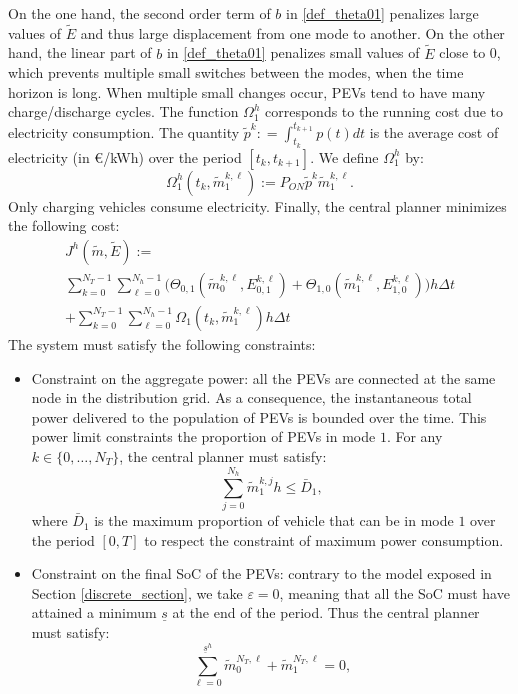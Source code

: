 \documentclass[conference]{IEEEtran}
\begin{document}
On the one hand, 
the second order term of $b$ in \eqref{def_theta01} penalizes large values of $\tilde{E}$  and thus large displacement from one mode to another. On the other hand, the linear part of $b$ in \eqref{def_theta01} penalizes small values of $\tilde{E}$ close to 0, which prevents multiple small switches between the modes, when the time horizon is long. When multiple small changes occur, PEVs tend to have many charge/discharge cycles. The function $\Omega^h_{1}$ corresponds to the running cost due to electricity consumption. The quantity $\textstyle \tilde{p}^k: = \int_{t_k}^{t_{k+1}}p(t)dt$ is the average cost of electricity (in \euro/kWh) over the period $[t_k,t_{k+1}]$. We define $\Omega^h_{1}$ by:
\begin{equation*}
\Omega^h_{1}(t_k,\tilde{m}_1^{k,\ell}):=P_{ON}\tilde{p}^k\tilde{m}^{k,\ell}_1.
\end{equation*}
Only charging vehicles consume electricity. 
Finally, the central planner minimizes the following cost:
\begin{equation}
\label{def_Jh_case_0}
\begin{array}{l}
 J^h(\tilde{m},\tilde{E}):=\\
\sum_{k=0}^{N_T-1}\sum_{\ell=0}^{N_h-1}
  \big(  \Theta_{0,1}(\tilde{m}^{k,\ell}_0,E_{0,1}^{k,\ell})
  +\Theta_{1,0}(\tilde{m}^{k,\ell}_1,E_{1,0}^{k,\ell})\big)
  h\Delta t\\
   +\sum_{k=0}^{N_T-1}\sum_{\ell=0}^{N_h-1} \Omega_{1}(t_k,\tilde{m}_1^{k,\ell}) h\Delta t
\end{array}
\end{equation}
The system must satisfy the following constraints:
\begin{itemize}
\item Constraint on the aggregate power: all the PEVs are connected at the same node in the distribution grid. As a consequence, the instantaneous total power delivered to the population of PEVs is bounded over the time. This power limit constraints the proportion of PEVs in mode $1$. For any $k\in\{0,\ldots,N_T \}$, the central planner must satisfy:
\begin{equation}
\label{contraintes:etat0}
\sum_{j=0}^{N_h}\tilde{m}_1^{k,j}h\leq \bar{D}_1,
\end{equation}
where $\bar{D}_1$ is the maximum proportion of vehicle that can be in mode $1$ over the period $[0,T]$ to respect the constraint of maximum power consumption.

\item Constraint on the final SoC of the PEVs: contrary to the model exposed in Section \ref{discrete_section}, we take $\varepsilon=0$, meaning that all the SoC must have attained a minimum $\underline{s}$ at the end of the period. Thus the central planner must satisfy:
\begin{equation}
\label{dis_smin0}
\sum_{\ell = 0}^{\underline{s}^h} \tilde{m}_0^{N_T,\ell} + \tilde{m}_1^{N_T,\ell} =0,
\end{equation}
\end{itemize}
\end{document}
